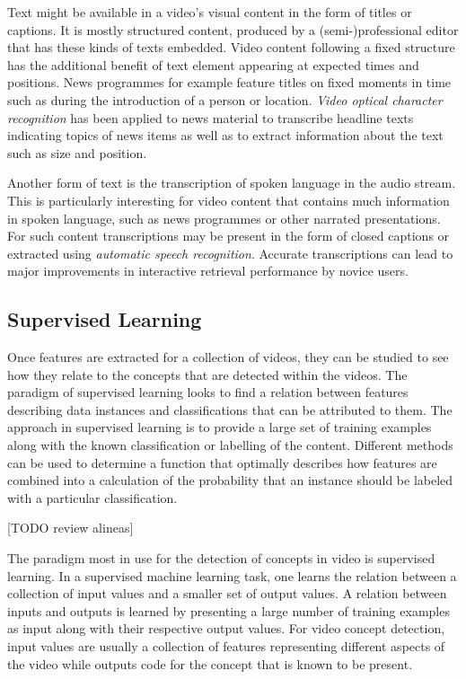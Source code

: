 Text might be available in a video's visual content in the form of titles or captions. It is mostly structured content, produced by a (semi-)professional editor that has these kinds of texts embedded. Video content following a fixed structure has the additional benefit of text element appearing at expected times and positions. News programmes for example feature titles on fixed moments in time such as during the introduction of a person or location. \emph{Video optical character recognition} has been applied to news material to transcribe headline texts indicating topics of news items as well as to extract information about the text such as size and position\cite{Kuwano:2000wy}.

Another form of text is the transcription of spoken language in the audio stream. This is particularly interesting for video content that contains much information in spoken language, such as news programmes or other narrated presentations. For such content transcriptions may be present in the form of closed captions or extracted using \emph{automatic speech recognition}. Accurate transcriptions can lead to major improvements in interactive retrieval performance by novice users\cite{Christel:2005td}.

\subsection{Supervised Learning}

Once features are extracted for a collection of videos, they can be studied to see how they relate to the concepts that are detected within the videos. The paradigm of supervised learning looks to find a relation between features describing data instances and classifications that can be attributed to them. The approach in supervised learning is to provide a large set of training examples along with the known classification or labelling of the content. Different methods can be used to determine a function that optimally describes how features are combined into a calculation of the probability that an instance should be labeled with a particular classification.

[TODO review alineas]

The paradigm most in use for the detection of concepts in video is supervised learning. In a supervised machine learning task, one learns the relation between a collection of input values and a smaller set of output values. A relation between inputs and outputs is learned by presenting a large number of training examples as input along with their respective output values. For video concept detection, input values are usually a collection of features representing different aspects of the video while outputs code for the concept that is known to be present. 

